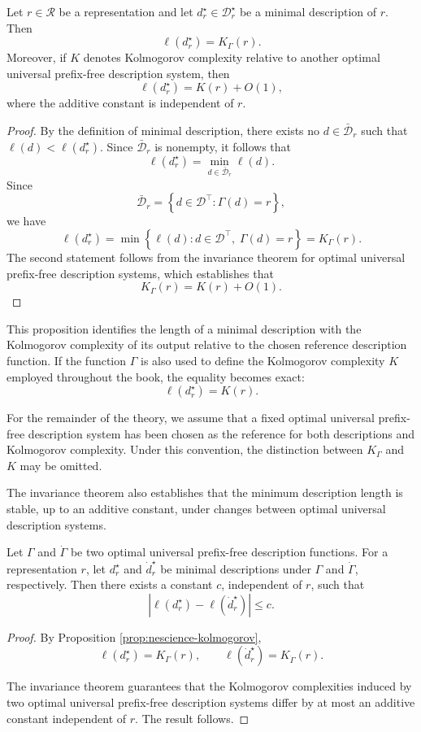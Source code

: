 \begin{proposition}
\label{prop:nescience-kolmogorov}
Let $r\in\mathcal{R}$ be a representation and let $d_r^\star\in\mathcal{D}_r^\star$ be a minimal description of $r$. Then
\[
\ell(d_r^\star)=K_\Gamma(r).
\]
Moreover, if $K$ denotes Kolmogorov complexity relative to another optimal universal prefix-free description system, then
\[
\ell(d_r^\star)=K(r)+O(1),
\]
where the additive constant is independent of $r$.
\end{proposition}
\begin{proof}
By the definition of minimal description, there exists no $d\in\bar{\mathcal{D}}_r$ such that $\ell(d)<\ell(d_r^\star)$. Since $\bar{\mathcal{D}}_r$ is nonempty, it follows that
\[
\ell(d_r^\star) = \min_{d\in\bar{\mathcal{D}}_r}\ell(d).
\]
Since
\[
\bar{\mathcal{D}}_r = \left\{ d\in\mathcal{D}^\top: \Gamma(d)=r \right\},
\]
we have
\[
\ell(d_r^\star) = \min \left\{ \ell(d): d\in\mathcal{D}^\top,\; \Gamma(d)=r \right\} = K_\Gamma(r).
\]
The second statement follows from the invariance theorem for optimal universal prefix-free description systems, which establishes that
\[
K_\Gamma(r)=K(r)+O(1).
\]
\end{proof}

This proposition identifies the length of a minimal description with the Kolmogorov complexity of its output relative to the chosen reference description function. If the function $\Gamma$ is also used to define the Kolmogorov complexity $K$ employed throughout the book, the equality becomes exact:
\[
\ell(d_r^\star)=K(r).
\]

For the remainder of the theory, we assume that a fixed optimal universal prefix-free description system has been chosen as the reference for both descriptions and Kolmogorov complexity. Under this convention, the distinction between $K_\Gamma$ and $K$ may be omitted.

The invariance theorem also establishes that the minimum description length is stable, up to an additive constant, under changes between optimal universal description systems.

\begin{corollary}
\label{cor:minimal_descriptions_invariance}
Let $\Gamma$ and $\dot{\Gamma}$ be two optimal universal prefix-free description functions. For a representation $r$, let $d_r^\star$ and $\dot{d}_r^\star$ be minimal descriptions under $\Gamma$ and $\dot{\Gamma}$, respectively. Then there exists a constant $c$, independent of $r$, such that
\[
\left| \ell(d_r^\star) - \ell(\dot{d}_r^\star) \right|
\leq c.
\]
\end{corollary}
\begin{proof}
By Proposition \ref{prop:nescience-kolmogorov},
\[
\ell(d_r^\star)=K_\Gamma(r), \qquad \ell(\dot{d}_r^\star)=K_{\dot{\Gamma}}(r).
\]

The invariance theorem guarantees that the Kolmogorov complexities induced by two optimal universal prefix-free description systems differ by at most an additive constant independent of $r$. The result follows.
\end{proof}

